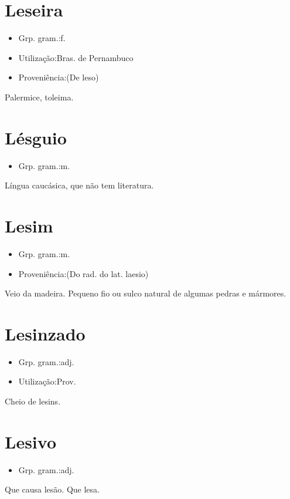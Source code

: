 \section{Leseira}
\begin{itemize}
\item {Grp. gram.:f.}
\end{itemize}
\begin{itemize}
\item {Utilização:Bras. de Pernambuco}
\end{itemize}
\begin{itemize}
\item {Proveniência:(De \textunderscore leso\textunderscore )}
\end{itemize}
Palermice, toleima.
\section{Lésguio}
\begin{itemize}
\item {Grp. gram.:m.}
\end{itemize}
Língua caucásica, que não tem literatura.
\section{Lesim}
\begin{itemize}
\item {Grp. gram.:m.}
\end{itemize}
\begin{itemize}
\item {Proveniência:(Do rad. do lat. \textunderscore laesio\textunderscore )}
\end{itemize}
Veio da madeira.
Pequeno fio ou sulco natural de algumas pedras e mármores.
\section{Lesinzado}
\begin{itemize}
\item {Grp. gram.:adj.}
\end{itemize}
\begin{itemize}
\item {Utilização:Prov.}
\end{itemize}
Cheio de lesins.
\section{Lesivo}
\begin{itemize}
\item {Grp. gram.:adj.}
\end{itemize}
Que causa lesão.
Que lesa.
